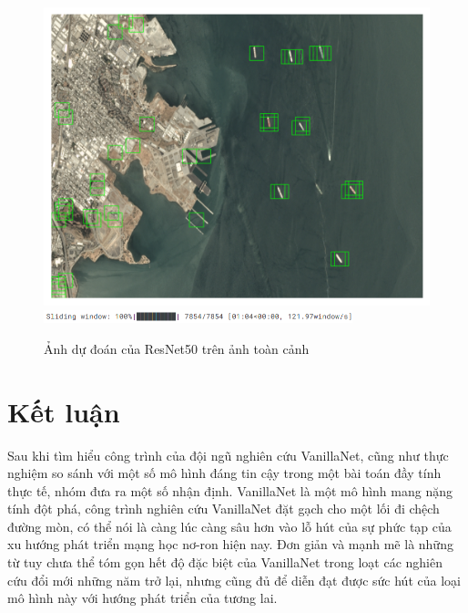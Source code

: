 \documentclass[a4paper,12pt]{article}
\begin{document}
\begin{figure}[H]
    \centering
    \includegraphics[width=0.8\linewidth]{__results___38_8.png}
    \includegraphics[width=0.8\textwidth]{tqdm_resnet50.png}
    \caption{Ảnh dự đoán của ResNet50 trên ảnh toàn cảnh}
\end{figure}
\newpage
\section{Kết luận}
Sau khi tìm hiểu công trình của đội ngũ nghiên cứu VanillaNet, cũng như thực nghiệm so sánh với một số mô hình đáng tin cậy trong một bài toán đầy tính thực tế, nhóm đưa ra một số nhận định. VanillaNet là một mô hình mang nặng tính đột phá, công trình nghiên cứu VanillaNet đặt gạch cho một lối đi chệch đường mòn, có thể nói là càng lúc càng sâu hơn vào lỗ hút của sự phức tạp của xu hướng phát triển mạng học nơ-ron hiện nay. Đơn giản và mạnh mẽ là những từ tuy chưa thể tóm gọn hết độ đặc biệt của VanillaNet trong loạt các nghiên cứu đổi mới những năm trở lại, nhưng cũng đủ để diễn đạt được sức hút của loại mô hình này với hướng phát triển của tương lai.



\end{document}
